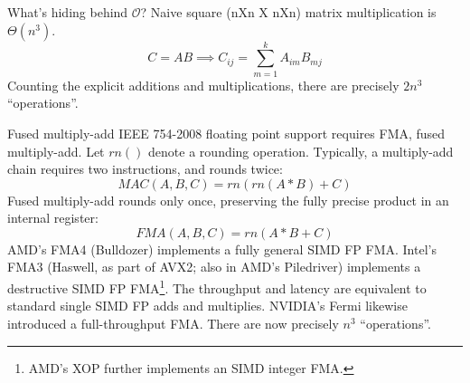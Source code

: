 \documentclass[mathserif,xcolor={dvipsnames,table}]{beamer}
\begin{document}
\begin{frame}{What's hiding behind $\mathcal{O}$?}
Naive square (nXn X nXn) matrix multiplication is $\Theta(n^{3})$.
\vfill
\begin{equation}
C = AB \implies C_{ij} = \sum\limits_{m=1}^{k} A_{im}B_{mj}
\end{equation}
\vfill
Counting the explicit additions and multiplications, there are
precisely $2n^{3}$ ``operations''.
\end{frame}

\begin{frame}{Fused multiply-add}
\small{
IEEE 754-2008 floating point support requires FMA, fused multiply-add.
Let $rn()$ denote a rounding operation. Typically, a multiply-add chain
requires two instructions, and rounds twice:
\begin{equation}
MAC(A,B,C) = rn(rn(A * B) + C)
\end{equation}
Fused multiply-add rounds only once, preserving the fully precise product in
an internal register:
\begin{equation}
FMA(A,B,C) = rn(A * B + C)
\end{equation}
AMD's FMA4 (Bulldozer) implements a fully general SIMD FP FMA. Intel's FMA3
(Haswell, as part of AVX2; also in AMD's Piledriver) implements a destructive
SIMD FP FMA\footnote{AMD's XOP further implements an SIMD integer FMA.}.
The throughput and latency are equivalent to standard single SIMD FP adds and
multiplies. NVIDIA's Fermi likewise introduced a full-throughput FMA.
\vfill
There are now precisely $n^{3}$ ``operations''.
}
\end{frame}
\end{document}
